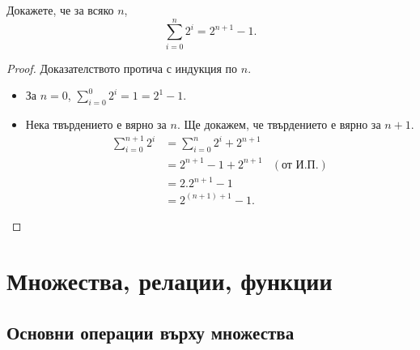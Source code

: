 \begin{problem}
  Докажете, че за всяко $n$, 
  \[\sum^n_{i=0} 2^i = 2^{n+1} - 1.\]
\end{problem}
\begin{proof}
  Доказателството протича с индукция по $n$.
  \begin{itemize}
  \item 
    За $n = 0$, $\sum^0_{i=0}2^i = 1 = 2^{1} - 1$.
  \item
    Нека твърдението е вярно за $n$.
    Ще докажем, че твърдението е вярно за $n+1$.
    \begin{align*}
      \sum^{n+1}_{i=0} 2^i & = \sum^{n}_{i=0}2^i + 2^{n+1}\\
      & = 2^{n+1} - 1 + 2^{n+1} & (\text{от И.П.})\\
      & = 2.2^{n+1} - 1 \\
      & = 2^{(n+1)+1} - 1.
    \end{align*}
  \end{itemize}
\end{proof}


\section{Множества, релации, функции}

\subsection*{Основни операции върху множества}

